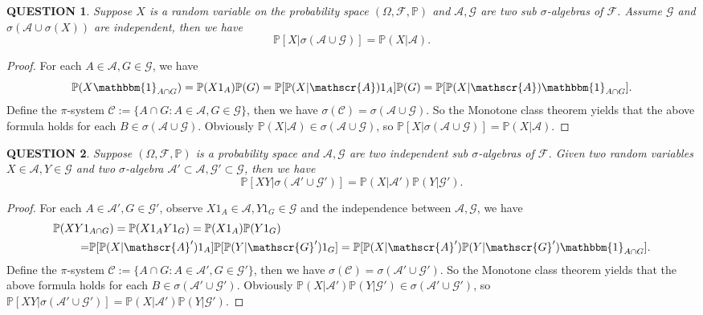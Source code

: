 \documentclass[12pt]{article}
\renewcommand{\(}{\left(}%
\renewcommand{\)}{\right)}%
\renewcommand{\[}{\left[}%
\renewcommand{\]}{\right]}%
\renewcommand{\a}{\mathscr{A}}
\newcommand{\p}{\mathbb{P}}
\newcommand{\f}{\mathscr{F}}
\newcommand{\g}{\mathscr{G}}
\newtheorem{question}{QUESTION}[section]}
\newtheorem{proof}{Proof.}}
\begin{document}
  \begin{question}
   Suppose $X$ is a random variable on the probability space $(\Omega,\f,\p )$  and $\a,\g$ are two  sub $\sigma$-algebras of $\f$. Assume $\g$ and $\sigma(\a\cup\sigma(X) )$ are independent, then we have
   \begin{equation*}
    \p[X|\sigma(\a\cup\g ) ]=\p(X|\a ).
   \end{equation*}
  \end{question}
  \begin{proof}
   For each $A\in\a,G\in\g$, we have
   \begin{equation*}
    \p(X\mathbbm{1}_{A\cap G})=\p(X1_A)\p(G)=\p[\p(X|\a)1_A]\p(G)=\p[\p(X|\a)\mathbbm{1}_{A\cap G}].
   \end{equation*}
   Define the $\pi$-system $\mathscr{C}:=\{A\cap G:A\in\a,G\in\g\}$, then we have $\sigma(\mathscr{C})=\sigma( \a\cup \g)$. So the {\sffamily Monotone class theorem} yields that the above formula holds for each $B\in \sigma( \a\cup \g)$.
   Obviously $\p(X|\a )\in \sigma( \a\cup \g)$, so $\p[X|\sigma(\a\cup\g ) ]=\p(X|\a )$.
  \end{proof}

  \begin{question}
   Suppose $(\Omega,\f,\p )$ is a probability space and $\a,\g$ are two independent sub $\sigma$-algebras of $\f$. Given two random variables $X\in\a,Y\in\g$ and two $\sigma$-algebra $\a'\subset\a,\g'\subset\g$, then we have
   \begin{equation*}
    \p[XY|\sigma( \a'\cup \g')]=\p(X|\a')\p(Y|\g').
   \end{equation*}
  \end{question}
  \begin{proof}
   For each $A\in\a',G\in\g'$, observe $X1_A\in \a,Y1_G\in\g$ and the independence between $\a,\g$, we have
   \begin{equation*}
    \begin{split}
     \p(XY1&_{A \cap G})=\p(X1_A Y1_G)=\p(X1_A)\p(Y1_G)\\
     =&\p[\p(X|\a')1_A]\p[\p(Y|\g')1_G]=\p[\p(X|\a')\p(Y|\g')\mathbbm{1}_{A\cap G}].
    \end{split}
   \end{equation*}
   Define the $\pi$-system $\mathscr{C}:=\{A\cap G:A\in\a',G\in\g'\}$, then we have $\sigma(\mathscr{C})=\sigma( \a'\cup \g')$. So the {\sffamily Monotone class theorem} yields that the above formula holds for each $B\in \sigma( \a'\cup \g')$.
   Obviously $\p(X|\a')\p(Y|\g')\in \sigma( \a'\cup \g')$, so $\p[XY|\sigma( \a'\cup \g')]=\p(X|\a')\p(Y|\g')$.
  \end{proof}
\end{document}
